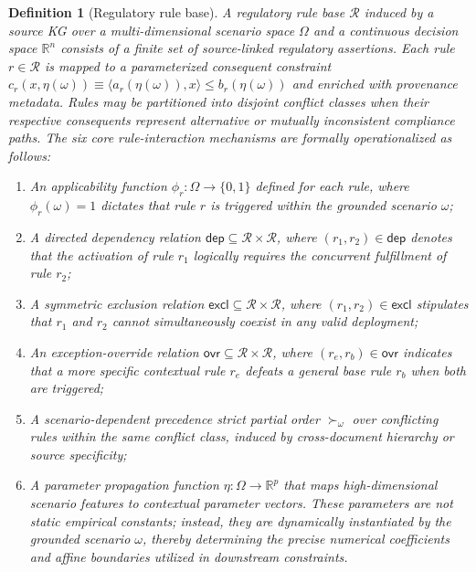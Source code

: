 ﻿\documentclass[a4paper,fleqn]{cas-dc}
\newtheorem{definition}{Definition}
\newcommand{\RR}{\mathbb{R}}
\newcommand{\calR}{\mathcal{R}}
\begin{document}
\begin{definition}[Regulatory rule base]
A \emph{regulatory rule base} $\calR$ induced by a source KG over a multi-dimensional scenario space $\Omega$ and a continuous decision space $\RR^n$ consists of a finite set of source-linked regulatory assertions. Each rule $r\in\calR$ is mapped to a parameterized consequent constraint $c_r(x,\eta(\omega)) \equiv \langle a_r(\eta(\omega)),x\rangle \leq b_r(\eta(\omega))$ and enriched with provenance metadata. Rules may be partitioned into disjoint conflict classes when their respective consequents represent alternative or mutually inconsistent compliance paths. The six core rule-interaction mechanisms are formally operationalized as follows:
\begin{enumerate}[label=(\roman*)]
  \item An \emph{applicability} function $\phi_r:\Omega\to\{0,1\}$ defined for each rule, where $\phi_r(\omega)=1$ dictates that rule $r$ is triggered within the grounded scenario $\omega$;
  \item A directed \emph{dependency} relation $\mathsf{dep}\subseteq\calR\times\calR$, where $(r_1,r_2)\in\mathsf{dep}$ denotes that the activation of rule $r_1$ logically requires the concurrent fulfillment of rule $r_2$;
  \item A symmetric \emph{exclusion} relation $\mathsf{excl}\subseteq\calR\times\calR$, where $(r_1,r_2)\in\mathsf{excl}$ stipulates that $r_1$ and $r_2$ cannot simultaneously coexist in any valid deployment;
  \item An \emph{exception-override} relation $\mathsf{ovr}\subseteq\calR\times\calR$, where $(r_e,r_b)\in\mathsf{ovr}$ indicates that a more specific contextual rule $r_e$ defeats a general base rule $r_b$ when both are triggered;
  \item A scenario-dependent \emph{precedence} strict partial order $\succ_\omega$ over conflicting rules within the same conflict class, induced by cross-document hierarchy or source specificity;
  \item A \emph{parameter propagation function} $\eta:\Omega\to\RR^p$ that maps high-dimensional scenario features to contextual parameter vectors. These parameters are not static empirical constants; instead, they are dynamically instantiated by the grounded scenario $\omega$, thereby determining the precise numerical coefficients and affine boundaries utilized in downstream constraints.
\end{enumerate}
\end{definition}
\end{document}
